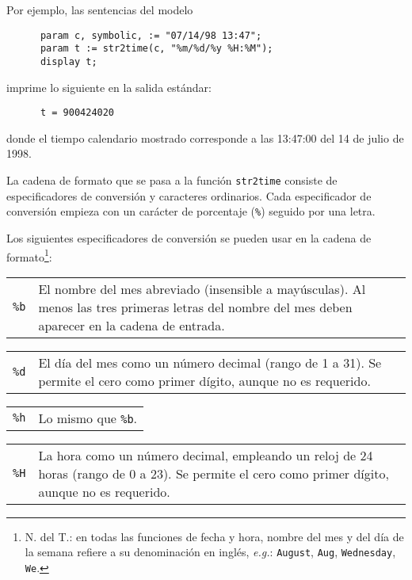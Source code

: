 \documentclass[11pt,spanish]{report}
\begin{document}
Por ejemplo, las sentencias del modelo

\begin{verbatim}
      param c, symbolic, := "07/14/98 13:47";
      param t := str2time(c, "%m/%d/%y %H:%M");
      display t;
\end{verbatim}

\noindent imprime lo siguiente en la salida estándar:

\begin{verbatim}
      t = 900424020
\end{verbatim}

\noindent donde el tiempo calendario mostrado corresponde a las 13:47:00 del 14 de julio de 1998.

La cadena de formato que se pasa a la función {\tt str2time} consiste de especificadores de conversión y caracteres ordinarios. Cada especificador de conversión empieza con un carácter de porcentaje ({\tt\%}) seguido por una letra.

Los siguientes especificadores de conversión se pueden usar en la cadena de formato\footnote{N. del T.: en todas las funciones de fecha y hora, nombre del mes y del día de la semana refiere a su denominación en inglés, {\it e.g.}: {\tt August}, {\tt Aug}, {\tt Wednesday}, {\tt We}.}:

\begin{tabular}{@{}p{20pt}p{421.5pt}@{}}
{\tt\%b}&El nombre del mes abreviado (insensible a mayúsculas). Al menos las tres primeras letras del nombre del mes deben aparecer en la cadena de entrada.\\
\end{tabular}

\begin{tabular}{@{}p{20pt}p{421.5pt}@{}}
{\tt\%d}&El día del mes como un número decimal (rango de 1 a 31). Se permite el cero como primer dígito, aunque no es requerido.\\
\end{tabular}

\begin{tabular}{@{}p{20pt}p{421.5pt}@{}}
{\tt\%h}&Lo mismo que {\tt\%b}.\\
\end{tabular}

\begin{tabular}{@{}p{20pt}p{421.5pt}@{}}
{\tt\%H}&La hora como un número decimal, empleando un reloj de 24 horas (rango de 0 a 23). Se permite el cero como primer dígito, aunque no es requerido.\\
\end{tabular}
\end{document}
